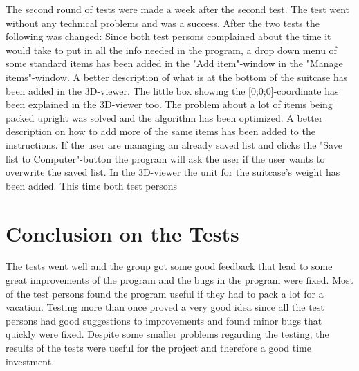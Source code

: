 The second round of tests were made a week after the second test. The test went without any technical problems and was a success. After the two tests the following was changed: Since both test persons complained about the time it would take to put in all the info needed in the program, a drop down menu of some standard items has been added in the "Add item"-window in the "Manage items"-window. A better description of what is at the bottom of the suitcase has been added in the 3D-viewer. The little box showing the [0;0;0]-coordinate has been explained in the 3D-viewer too. The problem about a lot of items being packed upright was solved and the algorithm has been optimized. A better description on how to add more of the same items has been added to the instructions. If the user are managing an already saved list and clicks the "Save list to Computer"-button the program will ask the user if the user wants to overwrite the saved list. In the 3D-viewer the unit for the suitcase's weight has been added. This time both test persons

\section{Conclusion on the Tests}
The tests went well and the group got some good feedback that lead to some great improvements of the program and the bugs in the program were fixed. Most of the test persons found the program useful if they had to pack a lot for a vacation. Testing more than once proved a very good idea since all the test persons had good suggestions to improvements and found minor bugs that quickly were fixed. Despite some smaller problems regarding the testing, the results of the tests were useful for the project and therefore a good time investment.